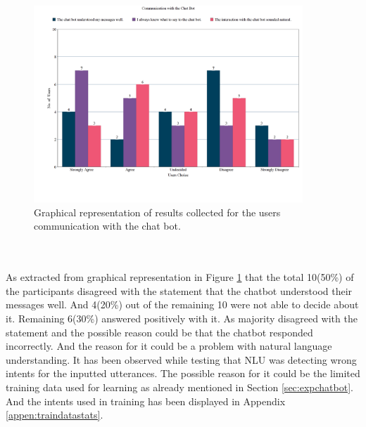 \begin{figure}[!h]
    \centering
    \includegraphics[width=0.9\textwidth]{img/Communication_with_the_Chat_Bot_Updated.png}
    \caption{Graphical representation of results collected for the users communication with the chat bot.}
    \label{fig:communwithBot}
\end{figure}
\\~\\
As extracted from graphical representation in Figure \ref{fig:communwithBot} that the total 10(50\%) of the participants disagreed with the statement that the chatbot understood their messages well. And 4(20\%) out of the remaining 10 were not able to decide about it. Remaining 6(30\%) answered positively with it. As majority disagreed with the statement and the possible reason could be that the chatbot responded incorrectly. And the reason for it could be a problem with natural language understanding. It has been observed while testing that NLU was detecting wrong intents for the inputted utterances. The possible reason for it could be the limited training data used for learning as already mentioned in Section \ref{sec:expchatbot}. And the intents used in training has been displayed in Appendix \ref{appen:traindatastats}.

